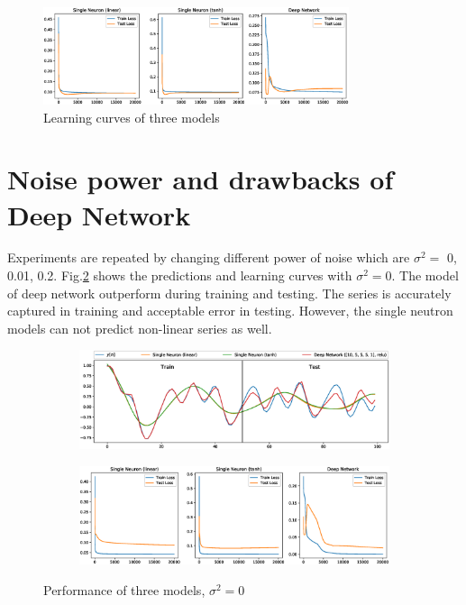 \begin{figure}[htb]
     \centering
     \includegraphics[width=0.8\textwidth]{fig/4/47a3.eps}
     \caption{Learning curves of three models}
     \label{fig:4_7_3}
\end{figure}
\newpage
\section{Noise power and drawbacks of Deep Network}
Experiments are repeated by changing different power of noise which are $\sigma^2=$ 0, 0.01, 0.2. Fig.\ref{fig:4_8_b} shows the predictions and learning curves with $\sigma^2=0$. The model of deep network outperform during training and testing. The series is accurately captured in training and acceptable error in testing. However, the single neutron models can not predict non-linear series as well. 
\begin{figure}[htb]
     \centering
     \begin{subfigure}[b]{0.8\textwidth}
         \centering
         \includegraphics[width=\textwidth]{fig/4/48b1.eps}
     \end{subfigure}
     \begin{subfigure}[b]{0.8\textwidth}
         \centering
         \includegraphics[width=\textwidth]{fig/4/48b2.eps}
     \end{subfigure}
     \caption{Performance of three models, $\sigma^2=0$}
     \label{fig:4_8_b}
\end{figure}\\

